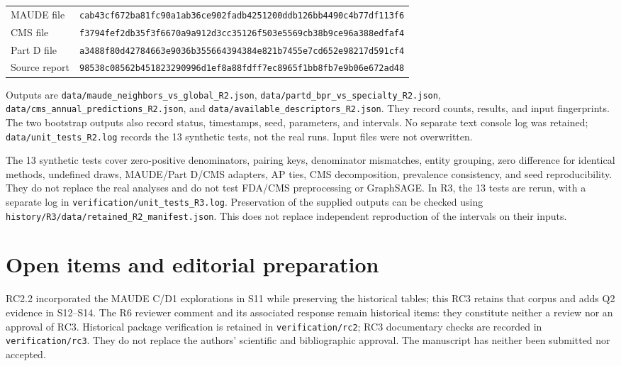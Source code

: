 \documentclass[10pt,a4paper]{article}
\newcommand{\src}[1]{{\small\nolinkurl{#1}}}
\begin{document}
\begin{tabularx}{\linewidth}{@{}lX@{}}
MAUDE file & \src{cab43cf672ba81fc90a1ab36ce902fadb4251200ddb126bb4490c4b77df113f6}\\
CMS file & \src{f3794fef2db35f3f6670a9a912d3cc35126f503e5569cb38b9ce96a388edfaf4}\\
Part D file & \src{a3488f80d42784663e9036b355664394384e821b7455e7cd652e98217d591cf4}\\
Source report & \src{98538c08562b451823290996d1ef8a88fdff7ec8965f1bb8fb7e9b06e672ad48}\\
\end{tabularx}

Outputs are \src{data/maude_neighbors_vs_global_R2.json}, \src{data/partd_bpr_vs_specialty_R2.json}, \src{data/cms_annual_predictions_R2.json}, and \src{data/available_descriptors_R2.json}. They record counts, results, and input fingerprints. The two bootstrap outputs also record status, timestamps, seed, parameters, and intervals. No separate text console log was retained; \src{data/unit_tests_R2.log} records the 13 synthetic tests, not the real runs. Input files were not overwritten.

The 13 synthetic tests cover zero-positive denominators, pairing keys, denominator mismatches, entity grouping, zero difference for identical methods, undefined draws, MAUDE/Part D/CMS adapters, AP ties, CMS decomposition, prevalence consistency, and seed reproducibility. They do not replace the real analyses and do not test FDA/CMS preprocessing or GraphSAGE.
In R3, the 13 tests are rerun, with a separate log in \src{verification/unit_tests_R3.log}. Preservation of the supplied outputs can be checked using \src{history/R3/data/retained_R2_manifest.json}. This does not replace independent reproduction of the intervals on their inputs.




\section{Open items and editorial preparation}
\label{supp:open}
RC2.2 incorporated the MAUDE C/D1 explorations in S11 while preserving the historical tables; this RC3 retains that corpus and adds Q2 evidence in S12--S14. The R6 reviewer comment and its associated response remain historical items: they constitute neither a review nor an approval of RC3. Historical package verification is retained in \src{verification/rc2}; RC3 documentary checks are recorded in \src{verification/rc3}. They do not replace the authors' scientific and bibliographic approval. The manuscript has neither been submitted nor accepted.
\end{document}
